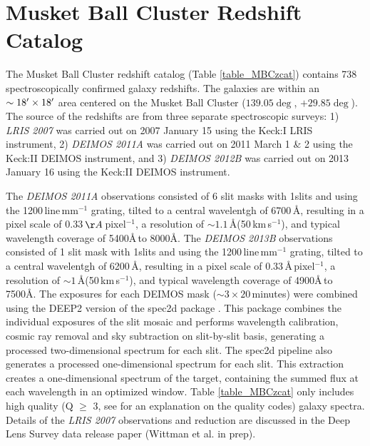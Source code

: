 \clearpage

\section{Musket Ball Cluster Redshift Catalog}\label{sec_MBCzcat}

The Musket Ball Cluster redshift catalog (Table \ref{table_MBCzcat}) contains 738 spectroscopically confirmed galaxy redshifts.  The galaxies are within an $\sim 18\hbox{$^\prime$} \times 18\hbox{$^\prime$}$ area centered on the Musket Ball Cluster ($139.05\deg$, $+29.85\deg$).  The source of the redshifts are from three separate spectroscopic surveys: 1) \emph{LRIS 2007} was carried out on 2007 January 15 using the Keck:I LRIS instrument, 2) \emph{DEIMOS 2011A} was carried out on 2011 March 1 \& 2 using the Keck:II DEIMOS instrument, and 3) \emph{DEIMOS 2012B} was carried out on 2013 January 16 using the Keck:II DEIMOS instrument.

The \emph{DEIMOS 2011A} observations consisted of 6 slit masks  with 1\arcsec slits and using the 1200\,line\,mm$^{-1}$ grating, tilted to a central wavelentgh of 6700\,\AA, resulting in a pixel scale of 0.33\,$\AA$\,pixel$^{-1}$, a resolution of $\sim1.1$\,\AA (50\,km\,s$^{-1}$), and typical wavelength coverage of 5400\AA\,to 8000\AA. 
The \emph{DEIMOS 2013B} observations consisted of 1 slit mask with 1\arcsec slits and using the 1200\,line\,mm$^{-1}$ grating, tilted to a central wavelentgh of 6200\,\AA, resulting in a pixel scale of 0.33\,\AA\,pixel$^{-1}$, a resolution of $\sim1$\,\AA (50\,km\,s$^{-1}$), and typical wavelength coverage of 4900\AA\,to 7500\AA. 
The exposures for each DEIMOS mask ($\sim3\times20$\,minutes) were combined using the DEEP2 version of the spec2d package \citep{Newman:2012ta}.
This package combines the individual exposures of the slit mosaic and performs wavelength calibration, cosmic ray removal and sky subtraction on slit-by-slit basis, generating a processed two-dimensional spectrum for each slit. 
The spec2d pipeline also generates a processed one-dimensional spectrum for each slit.
This extraction creates a one-dimensional spectrum of the target, containing the summed flux at each wavelength in an optimized window. 
Table \ref{table_MBCzcat} only includes high quality (Q $\geq$ 3, see \citet{Newman:2012ta} for an explanation on the quality codes) galaxy spectra.
Details of the \emph{LRIS 2007} observations and reduction are discussed in the Deep Lens Survey data release paper (Wittman et al. in prep).

